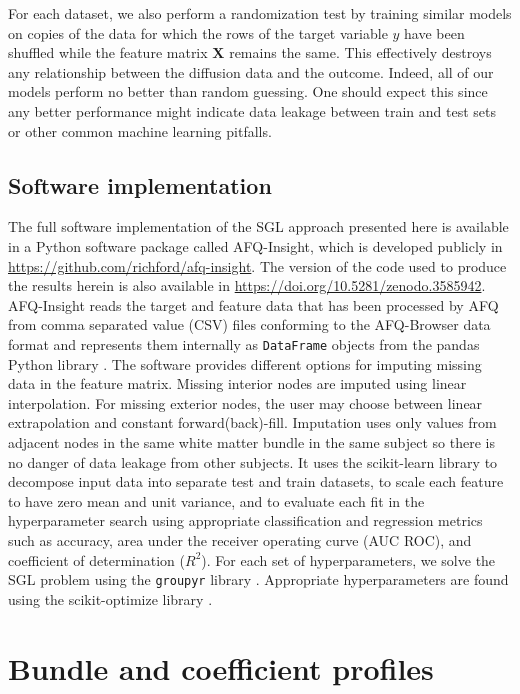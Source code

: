 \documentclass[10pt,%
               aps,%
               prl,%
               preprint,%
               superscriptaddress,%
               preprintnumbers,%
               amsmath,%
               floatfix,%
               endfloats*]{revtex4-2}
\begin{document}
For each dataset, we also perform a randomization test by training similar
models on copies of the data for which the rows of the target variable $y$
have been shuffled while the feature matrix $\mathbf{X}$ remains the same.
This effectively destroys any relationship between the diffusion data and the
outcome. Indeed, all of our models perform no better than random guessing.
One should expect this since any better performance might indicate data
leakage between train and test sets \cite{kaufman2012leakage} or other common
machine learning pitfalls.

\subsection{Software implementation}

The full software implementation of the SGL approach presented here is available
in a Python software package called AFQ-Insight, which is developed publicly in
\url{https://github.com/richford/afq-insight}. The version of the code used to
produce the results herein is also available in
\url{https://doi.org/10.5281/zenodo.3585942}.
AFQ-Insight reads the target and feature data that has been processed by AFQ
from comma separated value (CSV) files conforming to the AFQ-Browser data
format \cite{yeatman2018browser} and represents them internally as
\lstinline{DataFrame} objects from the pandas Python library
\cite{mckinney2010data}. The software provides different options for imputing
missing data in the feature matrix. Missing interior nodes are imputed using
linear interpolation. For missing exterior nodes, the user may choose between
linear extrapolation and constant forward(back)-fill. Imputation uses only
values from adjacent nodes in the same white matter bundle in the same
subject so there is no danger of data leakage from other subjects. It uses
the scikit-learn \cite{scikit-learn} library to decompose input data into
separate test and train datasets, to scale each feature to have zero mean and
unit variance, and to evaluate each fit in the hyperparameter search using
appropriate classification and regression metrics such as accuracy, area
under the receiver operating curve (AUC ROC), and coefficient of
determination ($R^2$). For each set of hyperparameters, we solve the SGL
problem using the \texttt{groupyr} library \cite{groupyr}. Appropriate
hyperparameters are found using the scikit-optimize library
\cite{scikit-optimize}.

\section{Bundle and coefficient profiles}
\label{sec:bundle-profiles}
\end{document}
